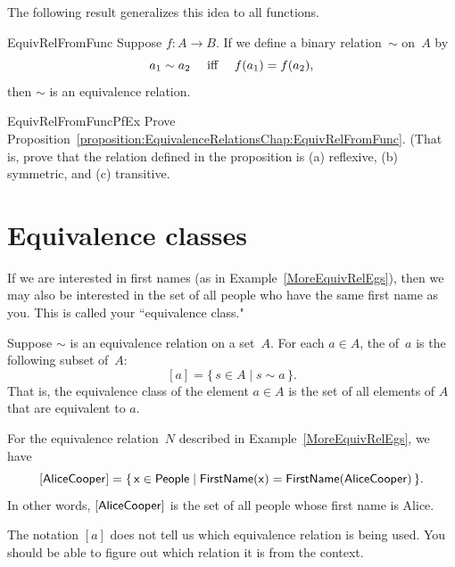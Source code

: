 The following result generalizes this idea to all functions.

\begin{prop}{EquivRelFromFunc}
Suppose $f \colon A \to B$. If we define a binary relation~$\sim$ on~$A$ by
	$$ \text{$a_1 \sim a_2$ \quad iff \quad $f(a_1) = f(a_2)$} ,$$
then $\sim$ is an equivalence relation.
\end{prop}

\begin{exercise}{EquivRelFromFuncPfEx}
Prove Proposition~\ref{proposition:EquivalenceRelationsChap:EquivRelFromFunc}. (That is, prove that the relation defined in the proposition is (a) reflexive, (b) symmetric, and (c) transitive.
\end{exercise}



 \section{Equivalence classes} \label{EquivalenceRelationsClassesSect}

If we are interested in first names (as in Example~\ref{MoreEquivRelEgs}), then we may also be interested in the set of all people who have the same first name as you. This is called your ``equivalence class."
 
 \begin{defn}\label{DefEquivRel}
 Suppose $\sim$ is an equivalence relation on a set~$A$. For each $a \in A$, the  of~$a$ is the following subset of~$A$:
 	$$ [a] = \{\, s \in A \mid s \sim a \,\} .$$
That is, the equivalence class of the element $a \in A$ is the set of all elements of $A$ that are equivalent to $a$.
\end{defn}


\begin{eg}
For the equivalence relation~$N$ described in Example~\ref{MoreEquivRelEgs}, we have
	$$ [\sf{Alice Cooper}] = \{\, x \in \sf{People} \mid \sf{FirstName}(x) = \sf{FirstName}(\sf{Alice Cooper}) \,\} .$$
In other words, $[\sf{Alice Cooper}]$ is the set of all people whose first name is Alice.
\end{eg}


\begin{warn}
The notation $[a]$ does not tell us which equivalence relation is being used. You should be able to figure out which relation it is from the context.
\end{warn}


